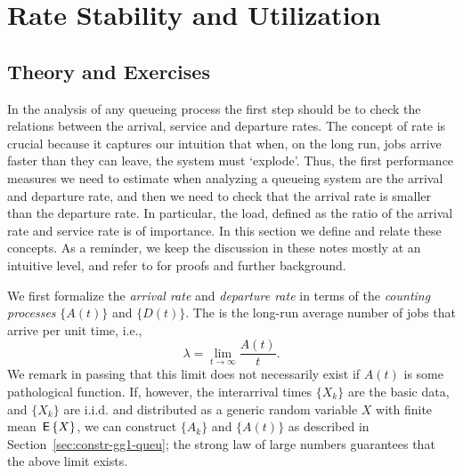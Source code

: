 \section{Rate Stability and Utilization}
\label{sec:rate-stability}

\subsection*{Theory and Exercises}


In the analysis of any queueing process the first step should be to
check the relations between the arrival, service and departure
rates. The concept of rate is crucial because it captures our
intuition that when, on the long run, jobs arrive faster than they can
leave, the system must `explode'. Thus, the first performance measures
we need to estimate when analyzing a queueing system are the arrival
and departure rate, and then we need to check that the arrival rate is
smaller than the departure rate. In particular, the load, defined as
the ratio of the arrival rate and service rate is of importance. In
this section we define and relate these concepts.  As a reminder, we
keep the discussion in these notes mostly at an intuitive level, and
refer to \cite{el-taha98:_sampl_path_analy_queuein_system} for proofs
and further background.


We first formalize the \emph{arrival rate} and \emph{departure rate}
in terms of the \emph{counting processes} $\{A(t)\}$ and $\{D(t)\}$.
The  is the long-run average number of jobs that
arrive per unit time, i.e.,
\begin{equation}
  \label{eq:3}
  \lambda = \lim_{t\to\infty} \frac{A(t)}t.
\end{equation}
We remark in passing that this limit does not necessarily exist if
$A(t)$ is some pathological function. If, however, the interarrival
times $\{X_k\}$ are the basic data, and $\{X_k\}$ are i.i.d.  and
distributed as a generic random variable $X$ with finite mean $\,\mathsf{E}\left\{X\right\}$,
we can construct $\{A_k\}$ and $\{A(t)\}$ as described in
Section~\ref{sec:constr-gg1-queu}; the strong law of large numbers
guarantees that the above limit exists.

